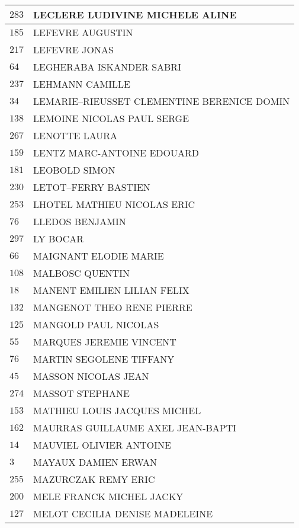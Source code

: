 \begin{xltabular}{\linewidth}{|l|X|}
    \hline
    $283$ & LECLERE LUDIVINE MICHELE ALINE \\
    \hline
    $185$ & LEFEVRE AUGUSTIN \\
    \hline
    $217$ & LEFEVRE JONAS \\
    \hline
    $64$ & LEGHERABA ISKANDER SABRI \\
    \hline
    $237$ & LEHMANN CAMILLE \\
    \hline
    $34$ & LEMARIE--RIEUSSET CLEMENTINE BERENICE DOMIN \\
    \hline
    $138$ & LEMOINE NICOLAS PAUL SERGE \\
    \hline
    $267$ & LENOTTE LAURA \\
    \hline
    $159$ & LENTZ MARC-ANTOINE EDOUARD \\
    \hline
    $181$ & LEOBOLD SIMON \\
    \hline
    $230$ & LETOT--FERRY BASTIEN \\
    \hline
    $253$ & LHOTEL MATHIEU NICOLAS ERIC \\
    \hline
    $76$ & LLEDOS BENJAMIN \\
    \hline
    $297$ & LY BOCAR \\
    \hline
    $66$ & MAIGNANT ELODIE MARIE \\
    \hline
    $108$ & MALBOSC QUENTIN \\
    \hline
    $18$ & MANENT EMILIEN LILIAN FELIX \\
    \hline
    $132$ & MANGENOT THEO RENE PIERRE \\
    \hline
    $125$ & MANGOLD PAUL NICOLAS \\
    \hline
    $55$ & MARQUES JEREMIE VINCENT \\
    \hline
    $76$ & MARTIN SEGOLENE TIFFANY \\
    \hline
    $45$ & MASSON NICOLAS JEAN \\
    \hline
    $274$ & MASSOT STEPHANE \\
    \hline
    $153$ & MATHIEU LOUIS JACQUES MICHEL \\
    \hline
    $162$ & MAURRAS GUILLAUME AXEL JEAN-BAPTI \\
    \hline
    $14$ & MAUVIEL OLIVIER ANTOINE \\
    \hline
    $3$ & MAYAUX DAMIEN ERWAN \\
    \hline
    $255$ & MAZURCZAK REMY ERIC \\
    \hline
    $200$ & MELE FRANCK MICHEL JACKY \\
    \hline
    $127$ & MELOT CECILIA DENISE MADELEINE \\

\end{xltabular}
